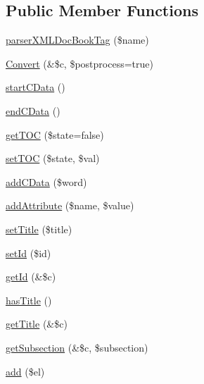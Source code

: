 \subsection*{\-Public \-Member \-Functions}
\begin{DoxyCompactItemize}
\item 
\hyperlink{classparser_x_m_l_doc_book_tag_a82914a103dc8d17dc8381487f3c2bc98}{parser\-X\-M\-L\-Doc\-Book\-Tag} (\$name)
\item 
\hyperlink{classparser_x_m_l_doc_book_tag_a77af191d91c08203fe89824e3909a3f8}{\-Convert} (\&\$c, \$postprocess=true)
\item 
\hyperlink{classparser_x_m_l_doc_book_tag_a26f8e60c07d4fce4491f4856748ef6cd}{start\-C\-Data} ()
\item 
\hyperlink{classparser_x_m_l_doc_book_tag_af3c50d0a599c408fe22b6d45c11bf418}{end\-C\-Data} ()
\item 
\hyperlink{classparser_x_m_l_doc_book_tag_a93d5b8abee0c4fff3d07ed06079afa37}{get\-T\-O\-C} (\$state=false)
\item 
\hyperlink{classparser_x_m_l_doc_book_tag_ae0f7da094c337544a2fae3b4f1f38df0}{set\-T\-O\-C} (\$state, \$val)
\item 
\hyperlink{classparser_x_m_l_doc_book_tag_a0a36ecc791001e97639775936db484ac}{add\-C\-Data} (\$word)
\item 
\hyperlink{classparser_x_m_l_doc_book_tag_af82ceb2e974a26f8ee432322ffe4117b}{add\-Attribute} (\$name, \$value)
\item 
\hyperlink{classparser_x_m_l_doc_book_tag_a884ba9bb0d54bde7839e798db7964476}{set\-Title} (\$title)
\item 
\hyperlink{classparser_x_m_l_doc_book_tag_a87313ad678fb2a2a8efb435cf0bdb9a0}{set\-Id} (\$id)
\item 
\hyperlink{classparser_x_m_l_doc_book_tag_a5f29c3c193e2dd716e45c6ce61200586}{get\-Id} (\&\$c)
\item 
\hyperlink{classparser_x_m_l_doc_book_tag_a6b53232fe8401fb4a0dc4868e9cb2d31}{has\-Title} ()
\item 
\hyperlink{classparser_x_m_l_doc_book_tag_adfee3a45ef4afc9b8201e4afd230708c}{get\-Title} (\&\$c)
\item 
\hyperlink{classparser_x_m_l_doc_book_tag_a81db4714e37e41027c2d1912a29b6c18}{get\-Subsection} (\&\$c, \$subsection)
\item 
\hyperlink{classparser_x_m_l_doc_book_tag_a263be36da0f80eea20685bae1dcc74c5}{add} (\$el)
\end{DoxyCompactItemize}
